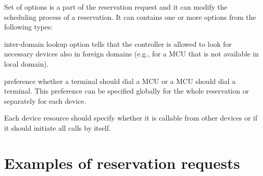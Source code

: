 Set of options is a part of the reservation request and it can modify the scheduling process of a reservation. It can contains one or more options from the following types:
\begin{compactitem}
\item inter-domain lookup option tells that the controller is allowed to look for necessary devices also in foreign domains (e.g., for a MCU that is not available in local domain).
\item preference whether a terminal should dial a MCU or a MCU should dial a terminal. This preference can be specified globally for the whole reservation or separately for each device.
\end{compactitem}
Each device resource should specify whether it is callable from other devices or if it should initiate all calls by itself.

\section{Examples of reservation requests}

\CodeStyleAppendImplementation
\CodeStyleAppendEnum

